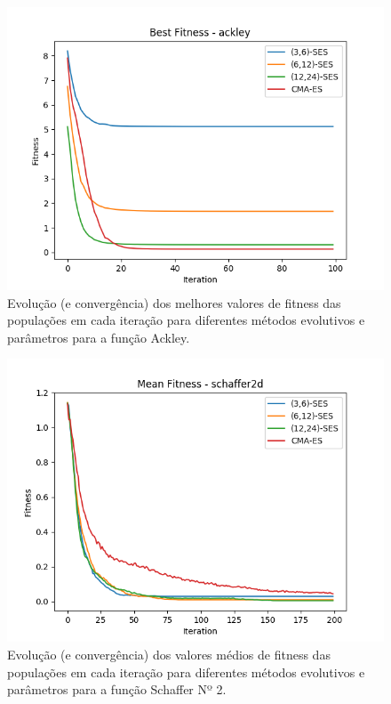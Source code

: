\documentclass[conference]{IEEEtran}
\begin{document}
\begin{figure}[htbp]
\centering
\centerline{\includegraphics[scale=0.4]{imagens/ackley/best_fitness.png}}
\caption{Evolução (e convergência) dos melhores valores de fitness das populações em cada iteração para diferentes métodos evolutivos e parâmetros para a função Ackley.}
\label{ackley/best_fitness}
\end{figure}

\begin{figure}[htbp]
\centering
\centerline{\includegraphics[scale=0.6]{imagens/schaffer2d/mean_fitness.png}}
\caption{Evolução (e convergência) dos valores médios de fitness das populações em cada iteração para diferentes métodos evolutivos e parâmetros para a função Schaffer Nº 2.}
\label{schaffer2d/mean_fitness}
\end{figure}
\end{document}

